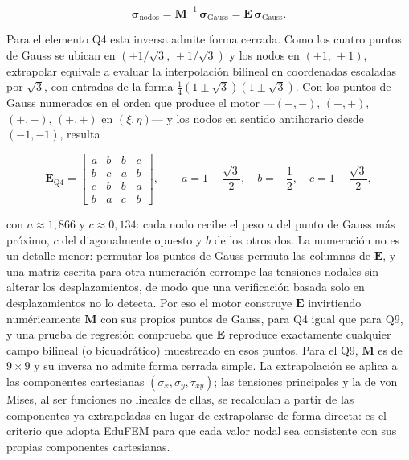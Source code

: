 \begin{equation}
\bm{\sigma}_{\text{nodos}} = \bm{M}^{-1}\,\bm{\sigma}_{\text{Gauss}} = \bm{E}\,\bm{\sigma}_{\text{Gauss}}.
\label{eq:extrap-inversa}
\end{equation}

Para el elemento Q4 esta inversa admite forma cerrada. Como los cuatro puntos de Gauss se ubican en $(\pm 1/\sqrt{3},\,\pm 1/\sqrt{3})$ y los nodos en $(\pm 1,\,\pm 1)$, extrapolar equivale a evaluar la interpolación bilineal en coordenadas escaladas por $\sqrt{3}$, con entradas de la forma $\tfrac{1}{4}(1\pm\sqrt{3})(1\pm\sqrt{3})$. Con los puntos de Gauss numerados en el orden que produce el motor —$(-,-)$, $(-,+)$, $(+,-)$, $(+,+)$ en $(\xi,\eta)$— y los nodos en sentido antihorario desde $(-1,-1)$, resulta

\begin{equation}
\bm{E}_{\text{Q4}} =
\begin{bmatrix}
a & b & b & c \\
b & c & a & b \\
c & b & b & a \\
b & a & c & b
\end{bmatrix},
\qquad
a = 1+\frac{\sqrt{3}}{2},\quad
b = -\frac{1}{2},\quad
c = 1-\frac{\sqrt{3}}{2},
\label{eq:extrap-q4}
\end{equation}

con $a \approx 1{,}866$ y $c \approx 0{,}134$: cada nodo recibe el peso $a$ del punto de Gauss más próximo, $c$ del diagonalmente opuesto y $b$ de los otros dos. La numeración no es un detalle menor: permutar los puntos de Gauss permuta las columnas de $\bm{E}$, y una matriz escrita para otra numeración corrompe las tensiones nodales sin alterar los desplazamientos, de modo que una verificación basada solo en desplazamientos no lo detecta. Por eso el motor construye $\bm{E}$ invirtiendo numéricamente $\bm{M}$ con sus propios puntos de Gauss, para Q4 igual que para Q9, y una prueba de regresión comprueba que $\bm{E}$ reproduce exactamente cualquier campo bilineal (o bicuadrático) muestreado en esos puntos. Para el Q9, $\bm{M}$ es de $9\times9$ y su inversa no admite forma cerrada simple. La extrapolación se aplica a las componentes cartesianas $(\sigma_x,\sigma_y,\tau_{xy})$; las tensiones principales y la de von Mises, al ser funciones no lineales de ellas, se recalculan a partir de las componentes ya extrapoladas en lugar de extrapolarse de forma directa: es el criterio que adopta EduFEM para que cada valor nodal sea consistente con sus propias componentes cartesianas.

